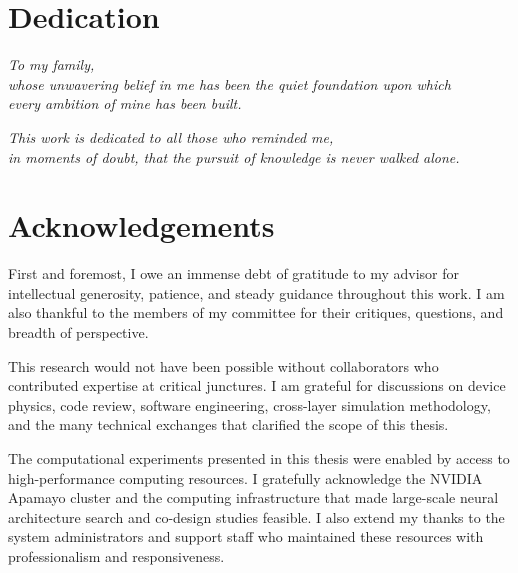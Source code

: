 
\chapter*{Dedication}

\vspace*{2cm}
\begin{center}
\textit{To my family,\\
whose unwavering belief in me has been the quiet foundation upon which\\
every ambition of mine has been built.}
\end{center}

\vspace*{1cm}
\begin{center}
\textit{This work is dedicated to all those who reminded me,\\
in moments of doubt, that the pursuit of knowledge is never walked alone.}
\end{center}

\clearpage

\chapter*{Acknowledgements}

First and foremost, I owe an immense debt of gratitude to my advisor for intellectual generosity, patience, and steady guidance throughout this work. I am also thankful to the members of my committee for their critiques, questions, and breadth of perspective.

This research would not have been possible without collaborators who contributed expertise at critical junctures. I am grateful for discussions on device physics, code review, software engineering, cross-layer simulation methodology, and the many technical exchanges that clarified the scope of this thesis.

The computational experiments presented in this thesis were enabled by access to high-performance computing resources. I gratefully acknowledge the NVIDIA Apamayo cluster and the computing infrastructure that made large-scale neural architecture search and co-design studies feasible. I also extend my thanks to the system administrators and support staff who maintained these resources with professionalism and responsiveness.

